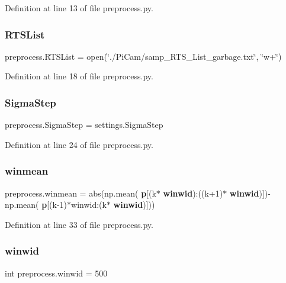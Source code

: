 Definition at line 13 of file preprocess.\+py.

\mbox{\label{namespacepreprocess_a831a3ee9205726fa67a5d76347cea0ad}} 
\subsubsection{R\+T\+S\+List}
{\footnotesize\ttfamily preprocess.\+R\+T\+S\+List = open(\char`\"{}./Pi\+Cam/samp\+\_\+\+R\+T\+S\+\_\+\+List\+\_\+garbage.\+txt\char`\"{}, \char`\"{}w+\char`\"{})}



Definition at line 18 of file preprocess.\+py.

\mbox{\label{namespacepreprocess_ac3d3fc4d08c632a62bfdac995460d322}} 
\subsubsection{Sigma\+Step}
{\footnotesize\ttfamily preprocess.\+Sigma\+Step = settings.\+Sigma\+Step}



Definition at line 24 of file preprocess.\+py.

\mbox{\label{namespacepreprocess_a6bab6a9b31ae31f96ca175d96453c0ba}} 
\subsubsection{winmean}
{\footnotesize\ttfamily preprocess.\+winmean = abs(np.\+mean(\textbf{ p}[(k$\ast$\textbf{ winwid})\+:((k+1)$\ast$\textbf{ winwid})])-\/np.\+mean(\textbf{ p}[(k-\/1)$\ast$winwid\+:(k$\ast$\textbf{ winwid})]))}



Definition at line 33 of file preprocess.\+py.

\mbox{\label{namespacepreprocess_af464b420b91309daf5308707c920efc1}} 
\subsubsection{winwid}
{\footnotesize\ttfamily int preprocess.\+winwid = 500}



